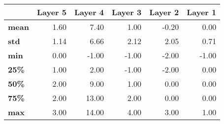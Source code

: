\begin{tabular}{lrrrrr}
\toprule
{} &  Layer 5 &  Layer 4 &  Layer 3 &  Layer 2 &  Layer 1 \\
\midrule
\textbf{mean} &     1.60 &     7.40 &     1.00 &    -0.20 &     0.00 \\
\textbf{std } &     1.14 &     6.66 &     2.12 &     2.05 &     0.71 \\
\textbf{min } &     0.00 &    -1.00 &    -1.00 &    -2.00 &    -1.00 \\
\textbf{25\% } &     1.00 &     2.00 &    -1.00 &    -2.00 &     0.00 \\
\textbf{50\% } &     2.00 &     9.00 &     1.00 &     0.00 &     0.00 \\
\textbf{75\% } &     2.00 &    13.00 &     2.00 &     0.00 &     0.00 \\
\textbf{max } &     3.00 &    14.00 &     4.00 &     3.00 &     1.00 \\
\bottomrule
\end{tabular}
